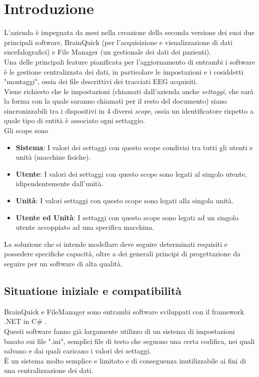 \documentclass[\main/tesi.tex]{subfiles}
\begin{document}
\chapter*{Introduzione} %

L'azienda è impegnata da mesi nella creazione della seconda versione dei suoi due principali software, BrainQuick (per l'acquisizione e visualizzazione di dati encefalografici) e File Manager (un gestionale dei dati dei pazienti).\\
Una delle principali feature pianificata per l'aggiornamento di entrambi i software è le gestione centralizzata dei dati, in particolare le impostazioni e i cosiddetti "montaggi", ossia dei file descrittivi dei tracciati EEG acquisiti.\\
Viene richiesto che le impostazioni (chiamati dall'azienda anche \textit{settaggi}, che sarà la forma con la quale saranno chiamati per il resto del documento) siano sincronizzabili tra i dispositivi in 4 diversi \textit{scope}, ossia un identificatore rispetto a quale tipo di entità è associato ogni settaggio.\\
Gli scope sono
\begin{itemize}
    \item \textbf{Sistema}: I valori dei settaggi con questo scope condivisi tra tutti gli utenti e unità (macchine fisiche).
    \item \textbf{Utente}: I valori dei settaggi con questo scope sono legati al singolo utente, idipendentemente dall'unità.
    \item \textbf{Unità}: I valori settaggi con questo scope sono legati alla singola unità.
    \item \textbf{Utente ed Unità}: I settaggi con questo scope sono legati ad un singolo utente accoppiato ad una specifica macchina.
\end{itemize}
La soluzione che si intende modellare deve seguire determinati requisiti e possedere specifiche capacità, oltre a dei generali principi di progettazione da seguire per un software di alta qualità.

\section{Situatione iniziale e compatibilità}
BrainQuick e FileManager sono entrambi software sviluppati con il framework .NET \cite{dotnet} in C\# \cite{csharp}.\\
Questi software fanno già largamente utilizzo di un sistema di impostazioni basato sui file ".ini", semplici file di testo che seguono una certa codifica, nei quali salvano e dai quali caricano i valori dei settaggi.\\
È un sistema molto semplice e limitato e di conseguenza inutilizzabile ai fini di una centralizzazione dei dati.\\
\end{document}
